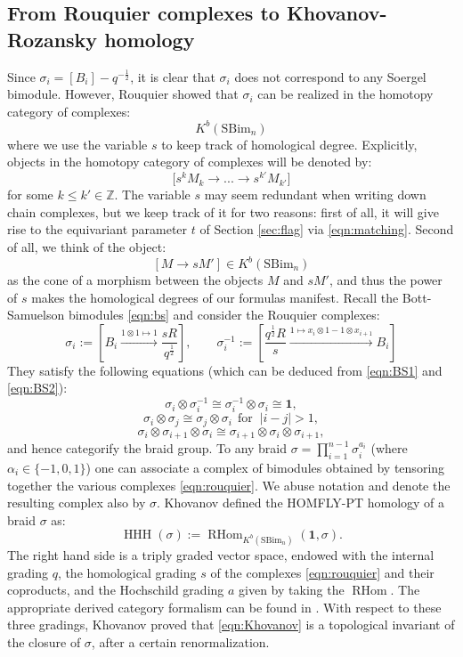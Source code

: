 \documentclass[12pt]{amsart}
\numberwithin{equation}{section}
\theoremstyle{definition}
\theoremstyle{remark}
\DeclareMathOperator{\RHom}{{RHom}}
\DeclareMathOperator{\HHH}{HHH}
\newcommand{\ZZ}{\mathbb{Z}}
\renewcommand{\1}{\mathbf{1}}
\newcommand{\SBim}{\mathrm{SBim}}
\begin{document}
\subsection{From Rouquier complexes to Khovanov-Rozansky homology}
\label{sub:khr}

Since  $\sigma_i=[B_i]-q^{-\frac 12}$, it is clear that $\sigma_i$ does not correspond to any Soergel bimodule. However, Rouquier showed that $\sigma_i$ can be realized in the homotopy category of complexes:
$$
K^b(\SBim_n)
$$
where we use the variable $s$ to keep track of homological degree. Explicitly, objects in the homotopy category of complexes will be denoted by:
$$
\Big[s^k M_k \rightarrow ... \rightarrow s^{k'} M_{k'} \Big]
$$
for some $k \leq k' \in \ZZ$. The variable $s$ may seem redundant when writing down chain complexes, but we keep track of it for two reasons: first of all, it will give rise to the equivariant parameter $t$ of Section \ref{sec:flag} via \eqref{eqn:matching}. Second of all, we think of the object: 
$$
\left[M \rightarrow s M' \right] \in K^b(\SBim_n)
$$
as the cone of a morphism between the objects $M$ and $s M'$, and thus the power of $s$ makes the homological degrees of our formulas manifest. Recall the Bott-Samuelson bimodules \eqref{eqn:bs} and consider the Rouquier complexes:
\begin{equation}
\label{eqn:rouquier}
\sigma_i:= \left[ B_i \xrightarrow{1\otimes 1 \mapsto 1} \frac {sR}{q^{\frac 12}}  \right], \qquad \sigma_i^{-1} := \left[ \frac {q^{\frac 12}R}s \xrightarrow{1 \mapsto x_i \otimes 1 - 1 \otimes x_{i+1}} B_i \right]
\end{equation}
They satisfy the following equations \cite{Kh,Rou} (which can be deduced from \eqref{eqn:BS1} and \eqref{eqn:BS2}):
$$
\sigma_i\otimes \sigma_i^{-1} \cong \sigma_i^{-1} \otimes \sigma_i \cong \1,
$$
$$
\sigma_i \otimes \sigma_j \cong \sigma_j \otimes \sigma_i \ \ \text{for }\ |i-j|>1,
$$
$$
\sigma_i \otimes \sigma_{i+1} \otimes \sigma_i \cong \sigma_{i+1} \otimes \sigma_i \otimes \sigma_{i+1},
$$
and hence categorify the braid group. To any braid $\sigma=\prod_{i=1}^{n-1} \sigma_{i}^{a_i}$ (where $\alpha_{i} \in \{-1,0,1\}$) one can associate a complex of bimodules obtained by tensoring together the various complexes \eqref{eqn:rouquier}. We abuse notation and denote the resulting complex also by $\sigma$. Khovanov \cite{Kh} defined the HOMFLY-PT homology of a braid $\sigma$ as: 
\begin{equation}
\label{eqn:Khovanov}
\HHH(\sigma):=\RHom_{K^b(\SBim_n)}(\1,\sigma).
\end{equation}
The right hand side is a triply graded vector space, endowed with the internal grading $q$, the homological grading $s$ of the complexes \eqref{eqn:rouquier} and their coproducts, and the Hochschild grading $a$ given by taking the $\RHom$. The appropriate derived category formalism can be found in \cite{Hog}. With respect to these three gradings, Khovanov proved that \eqref{eqn:Khovanov} is a topological invariant of the closure of $\sigma$, after a certain renormalization.
\end{document}
